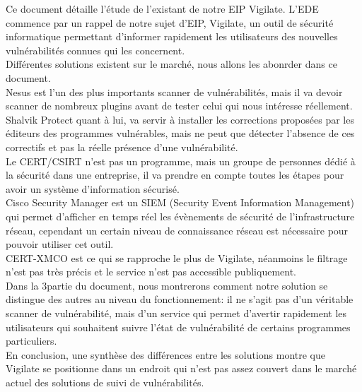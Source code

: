 Ce document détaille l'étude de l'existant de notre EIP Vigilate. L'EDE commence par un rappel de notre sujet d'EIP, Vigilate, un outil de sécurité informatique permettant d'informer rapidement les utilisateurs des nouvelles vulnérabilités connues qui les concernent.\\
Différentes solutions existent sur le marché, nous allons les abonrder dans ce document.\\
Nesus est l’un des plus importants scanner de vulnérabilités, mais il va devoir scanner de nombreux plugins avant de tester celui qui nous intéresse réellement.\\
Shalvik Protect quant à lui, va servir à installer les corrections proposées par les éditeurs des programmes vulnérables, mais ne peut que détecter l’absence de ces correctifs et pas la réelle présence d’une vulnérabilité.\\
Le CERT/CSIRT n’est pas un programme, mais un groupe de personnes dédié à la sécurité dans une entreprise, il va prendre en compte toutes les étapes pour avoir un système d’information sécurisé.\\
Cisco Security Manager est un SIEM (Security Event Information Management) qui permet d’afficher en temps réel les évènements de sécurité de l'infrastructure réseau, cependant un certain niveau de connaissance réseau est nécessaire pour pouvoir utiliser cet outil.\\
CERT-XMCO est ce qui se rapproche le plus de Vigilate, néanmoins le filtrage n’est pas très précis et le service n’est pas accessible publiquement.\\
Dans la 3\ieme partie du document, nous montrerons comment notre solution se distingue des autres au niveau du fonctionnement: il ne s’agit pas d’un véritable scanner de vulnérabilité, mais d’un service qui permet d’avertir rapidement les utilisateurs qui souhaitent suivre l’état de vulnérabilité de certains programmes particuliers.\\
En conclusion, une synthèse des différences entre les solutions montre que Vigilate se positionne dans un endroit qui n’est pas assez couvert dans le marché actuel des solutions de suivi de vulnérabilités.\\
